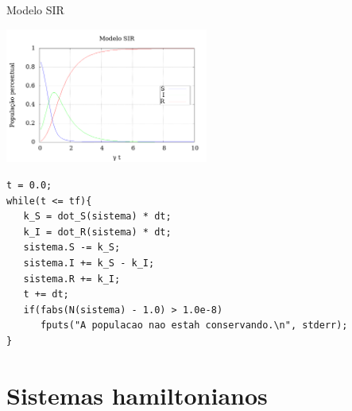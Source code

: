 \documentclass{beamer}
\begin{document}
\begin{frame}[fragile]{Modelo SIR}%
   \begin{center}
      \includegraphics[width=0.5\textwidth]{code/SIR.png}
   \end{center}

\scriptsize
\begin{lstlisting}[style = c]
t = 0.0;
while(t <= tf){
   k_S = dot_S(sistema) * dt;
   k_I = dot_R(sistema) * dt;
   sistema.S -= k_S;
   sistema.I += k_S - k_I;
   sistema.R += k_I;
   t += dt;
   if(fabs(N(sistema) - 1.0) > 1.0e-8)
      fputs("A populacao nao estah conservando.\n", stderr);
}
\end{lstlisting}

\end{frame}

\section{Sistemas hamiltonianos}
\end{document}

